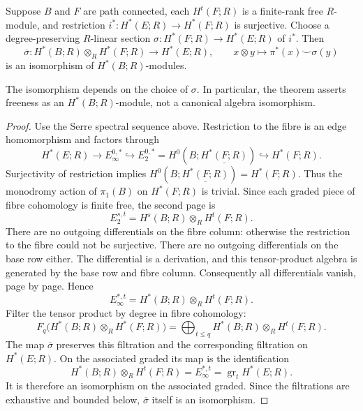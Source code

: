 \begin{theorem}
Suppose $B$ and $F$ are path connected, each $H^t(F;R)$ is a finite-rank free
$R$-module, and restriction $i^*:H^*(E;R)\to H^*(F;R)$ is surjective.
Choose a degree-preserving $R$-linear section
$\sigma:H^*(F;R)\to H^*(E;R)$ of $i^*$. Then
\[
 \overline\sigma:H^*(B;R)\otimes_RH^*(F;R)\longrightarrow H^*(E;R),
 \qquad x\otimes y\longmapsto\pi^*(x)\smile\sigma(y)
\]
is an isomorphism of $H^*(B;R)$-modules.
\end{theorem}
\begin{remark}
The isomorphism depends on the choice of $\sigma$. In particular, the theorem
asserts freeness as an $H^*(B;R)$-module, not a canonical algebra isomorphism.
\end{remark}
\begin{proof}
Use the Serre spectral sequence above. Restriction to the fibre is an edge
homomorphism and factors through
\[
 H^*(E;R)\longrightarrow E_\infty^{0,*}
 \hookrightarrow E_2^{0,*}=H^0(B;\underline{H^*(F;R)})
 \hookrightarrow H^*(F;R).
\]
Surjectivity of restriction implies
$H^0(B;\underline{H^*(F;R)})=H^*(F;R)$. Thus the monodromy action of
$\pi_1(B)$ on $H^*(F;R)$ is trivial. Since each graded piece of fibre
cohomology is finite free, the second page is
\[
 E_2^{s,t}=H^s(B;R)\otimes_R H^t(F;R).
\]
There are no outgoing differentials on the fibre column: otherwise the
restriction to the fibre could not be surjective. There are no outgoing
differentials on the base row either. The differential is a derivation,
and this tensor-product algebra is generated by the base row and fibre
column. Consequently all differentials vanish, page by page. Hence
\[
 E_
\infty^{*,t}=H^*(B;R)\otimes_RH^t(F;R).
\]
Filter the tensor product by degree in fibre cohomology:
\[
 F_q\bigl(H^*(B;R)\otimes_RH^*(F;R)\bigr)
   =\bigoplus_{t\leq q}H^*(B;R)\otimes_RH^t(F;R).
\]
The map $\overline\sigma$ preserves this filtration and the corresponding
filtration on $H^*(E;R)$. On the associated graded its map is the
identification
\[
 H^*(B;R)\otimes_RH^t(F;R)
   =E_\infty^{*,t}=\operatorname{gr}_tH^*(E;R).
\]
It is therefore an isomorphism on the associated graded. Since the
filtrations are exhaustive and bounded below, $\overline\sigma$ itself is
an isomorphism.
\end{proof}
